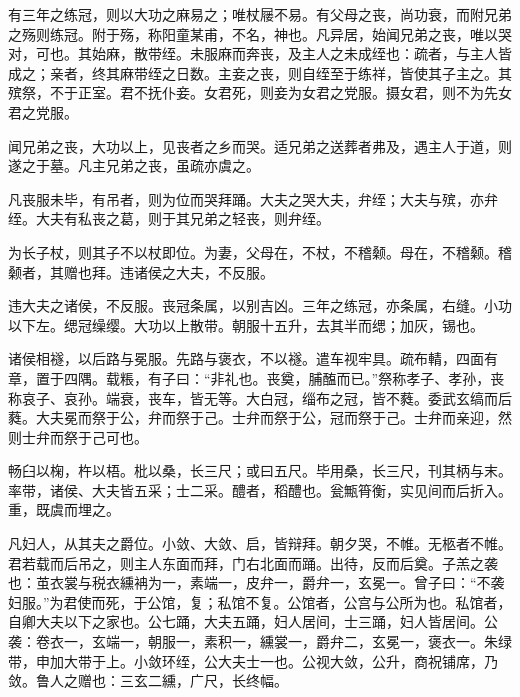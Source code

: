 \documentclass[]{article}
\begin{document}
有三年之练冠，则以大功之麻易之；唯杖屦不易。有父母之丧，尚功衰，而附兄弟之殇则练冠。附于殇，称阳童某甫，不名，神也。凡异居，始闻兄弟之丧，唯以哭对，可也。其始麻，散带绖。未服麻而奔丧，及主人之未成绖也：疏者，与主人皆成之；亲者，终其麻带绖之日数。主妾之丧，则自绖至于练祥，皆使其子主之。其殡祭，不于正室。君不抚仆妾。女君死，则妾为女君之党服。摄女君，则不为先女君之党服。

闻兄弟之丧，大功以上，见丧者之乡而哭。适兄弟之送葬者弗及，遇主人于道，则遂之于墓。凡主兄弟之丧，虽疏亦虞之。

凡丧服未毕，有吊者，则为位而哭拜踊。大夫之哭大夫，弁绖；大夫与殡，亦弁绖。大夫有私丧之葛，则于其兄弟之轻丧，则弁绖。

为长子杖，则其子不以杖即位。为妻，父母在，不杖，不稽颡。母在，不稽颡。稽颡者，其赠也拜。违诸侯之大夫，不反服。

违大夫之诸侯，不反服。丧冠条属，以别吉凶。三年之练冠，亦条属，右缝。小功以下左。缌冠缲缨。大功以上散带。朝服十五升，去其半而缌；加灰，锡也。

诸侯相襚，以后路与冕服。先路与褒衣，不以襚。遣车视牢具。疏布輤，四面有章，置于四隅。载粻，有子曰：``非礼也。丧奠，脯醢而已。''祭称孝子、孝孙，丧称哀子、哀孙。端衰，丧车，皆无等。大白冠，缁布之冠，皆不蕤。委武玄缟而后蕤。大夫冕而祭于公，弁而祭于己。士弁而祭于公，冠而祭于己。士弁而亲迎，然则士弁而祭于己可也。

畅臼以椈，杵以梧。枇以桑，长三尺；或曰五尺。毕用桑，长三尺，刊其柄与末。率带，诸侯、大夫皆五采；士二采。醴者，稻醴也。瓮甒筲衡，实见间而后折入。重，既虞而埋之。

凡妇人，从其夫之爵位。小敛、大敛、启，皆辩拜。朝夕哭，不帷。无柩者不帷。君若载而后吊之，则主人东面而拜，门右北面而踊。出待，反而后奠。子羔之袭也：茧衣裳与税衣纁袡为一，素端一，皮弁一，爵弁一，玄冕一。曾子曰：``不袭妇服。''为君使而死，于公馆，复；私馆不复。公馆者，公宫与公所为也。私馆者，自卿大夫以下之家也。公七踊，大夫五踊，妇人居间，士三踊，妇人皆居间。公袭：卷衣一，玄端一，朝服一，素积一，纁裳一，爵弁二，玄冕一，褒衣一。朱绿带，申加大带于上。小敛环绖，公大夫士一也。公视大敛，公升，商祝铺席，乃敛。鲁人之赠也：三玄二纁，广尺，长终幅。
\end{document}
